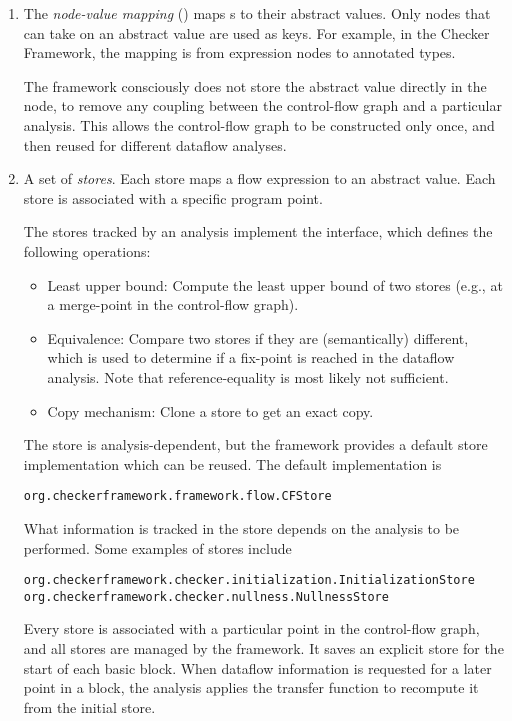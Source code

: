 \begin{enumerate}
\item
The \emph{node-value mapping} () maps s to their abstract
values.  Only nodes that can take on an abstract value are
used as keys.  For example, in the Checker Framework, the mapping is
from expression nodes to annotated types.

The framework consciously does not store the abstract value
directly in the node, to remove any coupling between the control-flow
graph and a particular analysis.  This allows the control-flow graph
to be constructed only once, and then reused for different dataflow
analyses.

\item
A set of \emph{stores}.  Each store maps a flow expression to an
abstract value.  Each store is associated with a specific program point.

The stores tracked by an analysis implement the 
interface, which defines the following operations:
\begin{itemize}
\item Least upper bound: Compute the least upper bound of two stores
  (e.g., at a merge-point in the control-flow graph).
\item Equivalence: Compare two stores if they are (semantically)
  different, which is used to determine if a fix-point is reached in
  the dataflow analysis. Note that reference-equality is most likely
  not sufficient.
\item Copy mechanism: Clone a store to get an exact copy.
\end{itemize}
The store is analysis-dependent, but the framework provides a default
store implementation which can be reused.  The default implementation
is
\begin{verbatim}org.checkerframework.framework.flow.CFStore\end{verbatim}

What information is tracked in the store depends on the analysis to be
 performed.  Some examples of stores include
\begin{verbatim}
org.checkerframework.checker.initialization.InitializationStore
org.checkerframework.checker.nullness.NullnessStore
\end{verbatim}

Every store is associated with a particular point in the control-flow
graph, and all stores are managed by the framework. It saves an explicit store
for the start of each basic block.
When dataflow information
is requested for a later point in a block, the analysis applies the
transfer function to recompute it from the initial store.

\end{enumerate}

